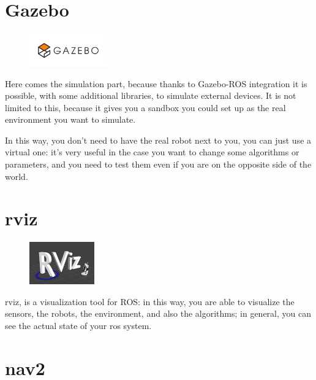 \section{Gazebo}
\label{sec:gazebo} %

\begin{figure}
    \includegraphics[width=0.3\textwidth]{images/gazebo}
\end{figure}

Here comes the simulation part, because thanks to Gazebo-ROS integration it is possible, with some additional libraries, to simulate external devices. It is not limited to this, because it gives you a sandbox you could set up as the real environment you want to simulate.

In this way, you don't need to have the real robot next to you, you can just use a virtual one: it's very useful in the case you want to change some algorithms or parameters, and you need to test them even if you are on the opposite side of the world.


\section{\acrfull{rviz}}

\begin{figure}
    \includegraphics[width=0.25\textwidth]{images/rviz}
\end{figure}

\Acrshort{rviz}, is a visualization tool for ROS: in this way, you are able to visualize the sensors, the robots, the environment, and also the algorithms; in general, you can see the actual state of your \acrshort{ros} system. %

\section{\acrfull{nav2}}

